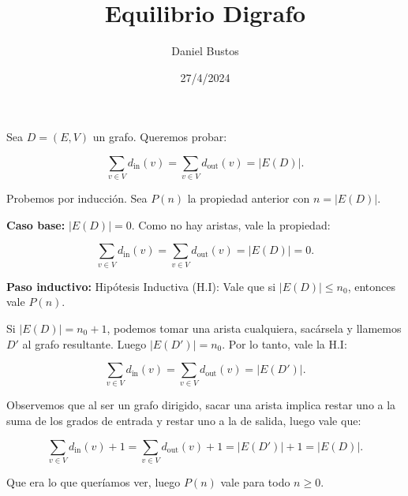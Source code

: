 \documentclass{article}
\begin{document}
\title{Equilibrio Digrafo}
\author{Daniel Bustos}
\date{27/4/2024}
\maketitle

Sea \( D = (E,V) \) un grafo. Queremos probar:

\[
\sum_{v \in V} d_{\text{in}}(v) = \sum_{v \in V} d_{\text{out}}(v) = |E(D)|.
\]

Probemos por inducción. Sea \( P(n) \) la propiedad anterior con \( n = |E(D)| \).

\textbf{Caso base:} \( |E(D)| = 0 \). Como no hay aristas, vale la propiedad:

\[
\sum_{v \in V} d_{\text{in}}(v) = \sum_{v \in V} d_{\text{out}}(v) = |E(D)| = 0.
\]

\bigskip

\textbf{Paso inductivo:} Hipótesis Inductiva (H.I): Vale que si \( |E(D)| \leq n_0 \), entonces vale \( P(n) \).

Si \( |E(D)| = n_0 + 1 \), podemos tomar una arista cualquiera, sacársela y llamemos \( D' \) al grafo resultante. Luego \( |E(D')| = n_0 \). Por lo tanto, vale la H.I: 

\[
\sum_{v \in V} d_{\text{in}}(v) = \sum_{v \in V} d_{\text{out}}(v) = |E(D')|.
\]

Observemos que al ser un grafo dirigido, sacar una arista implica restar uno a la suma de los grados de entrada y restar uno a la de salida, luego vale que:

\[
\sum_{v \in V} d_{\text{in}}(v) + 1 = \sum_{v \in V} d_{\text{out}}(v) + 1 = |E(D')| + 1 = |E(D)|.
\]

Que era lo que queríamos ver, luego \( P(n) \) vale para todo \( n \geq 0 \).
\end{document}
